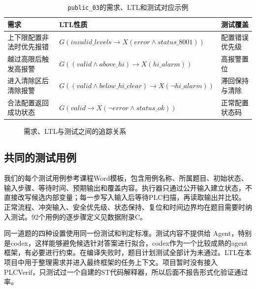 \documentclass[UTF8,a4paper,zihao=-4]{ctexart}
\begin{document}
\begin{table}[H]
  \centering
  \caption{\texttt{public\_03}的需求、LTL和测试对应示例}
  \label{tab:trace-example}
  \begin{tabularx}{\textwidth}{L{3.2cm}X L{3.0cm}}
    \toprule
    需求 & LTL性质 & 测试覆盖\\
    \midrule
    上下限配置非法时优先报错 & $G(invalid\_levels \rightarrow X(error \land status\_8001))$ & 配置错误优先级\\
    越过高限后触发高报警 & $G((valid \land above\_hi) \rightarrow X(hi\_alarm))$ & 高报警置位\\
    进入清除区后清除报警 & $G((valid \land below\_hi\_clear) \rightarrow X(\neg hi\_alarm))$ & 滞回保持与清除\\
    合法配置返回成功状态 & $G(valid \rightarrow X(\neg error \land status\_ok))$ & 正常配置状态码\\
    \bottomrule
  \end{tabularx}
\end{table}

\begin{figure}[H]
  \centering
  \caption{需求、LTL与测试之间的追踪关系}
  \label{fig:spec-trace}
\end{figure}

\subsection{共同的测试用例}
我们的每个测试用例参考课程Word模板，包含用例名称、所属题目、初始状态、输入步骤、等待时间、预期输出和覆盖内容。执行器只通过公开输入建立状态，不直接改写候选内部变量；每一步写入输入后等待PLC扫描，再读取输出并比较。正常流程、冲突输入、安全优先级、状态保持、复位和时间边界均在题目需要时纳入测试。92个用例的逐步骤定义见数据附录C。

同一道题的四种设置使用同一份测试和判定标准。测试内容不提供给 Agent，特别是codex，这样能够避免候选针对答案进行拟合，codex作为一个比较成熟的agent框架，有必要进行约束。在编译失败时，题目计划测试全部计为未通过。LTL在本项目中用于整理需求并进入最终框架的任务上下文。项目暂时没有接入PLCVerif，只测试过一个自建的ST代码解释器，所以后面不报告形式化验证通过率。
\end{document}
